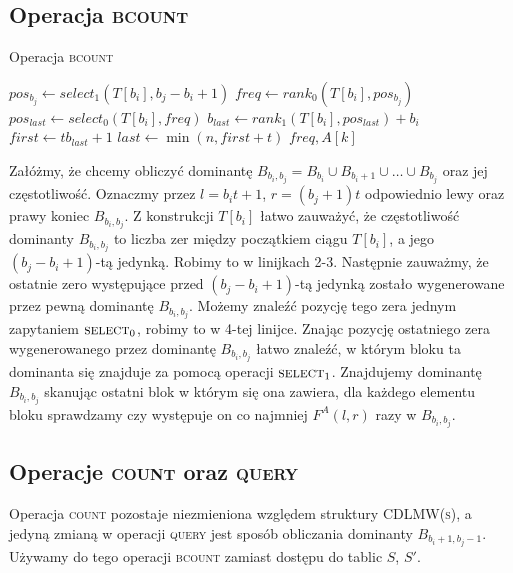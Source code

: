 \subsection{Operacja \textsc{bcount}}
\begin{algorithm}
    \caption{Operacja \textsc{bcount}}
    \label{alg:cdlmw-bp-bcount}
    \begin{algorithmic}[1]
            \State $pos_{b_j} \gets select_1(T[b_i], b_j-b_i+1)$
            \State $freq \gets rank_0(T[b_i], pos_{b_j})$
            \State $pos_{last} \gets select_0(T[b_i], freq)$
            \State $b_{last} \gets rank_1(T[b_i], pos_{last}) + b_i$
            \State $first \gets tb_{last}+1$
            \State $last \gets \min(n,first+t)$
                    \State \Return $freq, A[k]$
                \EndIf
            \EndFor
        \EndFunction
    \end{algorithmic}
\end{algorithm}
Załóżmy, że chcemy obliczyć dominantę $B_{b_i,b_j} = B_{b_i} \cup B_{b_i+1} \cup \dots \cup B_{b_j}$ oraz jej częstotliwość. Oznaczmy przez $l=b_it+1$, $r=(b_j+1)t$ odpowiednio lewy oraz prawy koniec $B_{b_i,b_j}$.
Z konstrukcji $T[b_i]$ łatwo zauważyć, że częstotliwość dominanty $B_{b_i,b_j}$ to liczba zer między początkiem ciągu $T[b_i]$, a jego $(b_j-b_i+1)$-tą jedynką. Robimy to w linijkach 2-3. Następnie zauważmy, że ostatnie zero występujące przed $(b_j-b_i+1)$-tą jedynką zostało wygenerowane przez pewną dominantę $B_{b_i, b_j}$. Możemy znaleźć pozycję tego zera jednym zapytaniem $\textsc{select}_0$, robimy to w 4-tej linijce. Znając pozycję ostatniego zera wygenerowanego przez dominantę $B_{b_i,b_j}$ łatwo znaleźć, w którym bloku ta dominanta się znajduje za pomocą operacji $\textsc{select}_1$. Znajdujemy dominantę $B_{b_i, b_j}$ skanując ostatni blok w którym się ona zawiera, dla każdego elementu bloku sprawdzamy czy występuje on co najmniej $F^A(l, r)$ razy w $B_{b_i,b_j}$.

\subsection{Operacje \textsc{count} oraz \textsc{query}}
Operacja \textsc{count} pozostaje niezmieniona względem struktury \textsc{CDLMW(s)}, a jedyną zmianą w operacji \textsc{query} jest sposób obliczania dominanty $B_{b_i+1, b_j-1}$. Używamy do tego operacji \textsc{bcount} zamiast dostępu do tablic $S$, $S'$.

